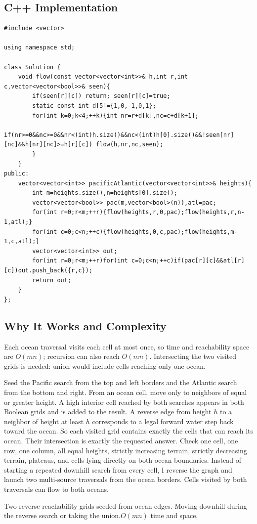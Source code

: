 \subsection{C++ Implementation}
\begin{lstlisting}[style=compactcode,caption={Complete C++ solution: Pacific Atlantic Water Flow}]
#include <vector>

using namespace std;

class Solution {
    void flow(const vector<vector<int>>& h,int r,int c,vector<vector<bool>>& seen){
        if(seen[r][c]) return; seen[r][c]=true;
        static const int d[5]={1,0,-1,0,1};
        for(int k=0;k<4;++k){int nr=r+d[k],nc=c+d[k+1];
            if(nr>=0&&nc>=0&&nr<(int)h.size()&&nc<(int)h[0].size()&&!seen[nr][nc]&&h[nr][nc]>=h[r][c]) flow(h,nr,nc,seen);
        }
    }
public:
    vector<vector<int>> pacificAtlantic(vector<vector<int>>& heights){
        int m=heights.size(),n=heights[0].size();
        vector<vector<bool>> pac(m,vector<bool>(n)),atl=pac;
        for(int r=0;r<m;++r){flow(heights,r,0,pac);flow(heights,r,n-1,atl);}
        for(int c=0;c<n;++c){flow(heights,0,c,pac);flow(heights,m-1,c,atl);}
        vector<vector<int>> out;
        for(int r=0;r<m;++r)for(int c=0;c<n;++c)if(pac[r][c]&&atl[r][c])out.push_back({r,c});
        return out;
    }
};
\end{lstlisting}

\subsection{Why It Works and Complexity}
Each ocean traversal visits each cell at most once, so time and reachability
space are \(O(mn)\); recursion can also reach \(O(mn)\). Intersecting the two
visited grids is needed: union would include cells reaching only one ocean.

\lessonexpansion
  {Seed the Pacific search from the top and left borders and the Atlantic
   search from the bottom and right. From an ocean cell, move only to neighbors
   of equal or greater height. A high interior cell reached by both searches
   appears in both Boolean grids and is added to the result.}
  {A reverse edge from height \(h\) to a neighbor of height at least \(h\)
   corresponds to a legal forward water step back toward the ocean. So each
   visited grid contains exactly the cells that can reach its ocean. Their
   intersection is exactly the requested answer.}
  {Check one cell, one row, one column, all equal heights, strictly increasing
   terrain, strictly decreasing terrain, plateaus, and cells lying directly on
   both ocean boundaries.}
  {Instead of starting a repeated downhill search from every cell, I reverse
   the graph and launch two multi-source traversals from the ocean borders.
   Cells visited by both traversals can flow to both oceans.}

  {Two reverse reachability grids seeded from ocean edges.}
  {Moving downhill during the reverse search or taking the union.}{$O(mn)$ time and space.}
